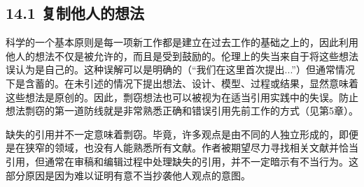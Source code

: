 \subsection*{14.1 复制他人的想法}
科学的一个基本原则是每一项新工作都是建立在过去工作的基础之上的，因此利用他人的想法不仅是被允许的，而且是受到鼓励的。伦理上的失当来自于将这些想法误认为是自己的。这种误解可以是明确的（“我们在这里首次提出...”）但通常情况下是含蓄的。在未引述的情况下提出想法、设计、模型、过程或结果，显然意味着这些想法是原创的。因此，剽窃想法也可以被视为在适当引用实践中的失误。防止想法剽窃的第一道防线就是非常熟悉正确和错误引用先前工作的方式（见第5章）。

缺失的引用并不一定意味着剽窃。毕竟，许多观点是由不同的人独立形成的，即便是在狭窄的领域，也没有人能熟悉所有文献。作者被期望尽力寻找相关文献并恰当引用，但通常在审稿和编辑过程中处理缺失的引用，并不一定暗示有不当行为。这部分原因是因为难以证明有意不当抄袭他人观点的意图。

